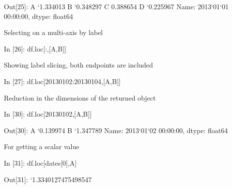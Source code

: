 \documentclass[letterpaper,10pt,english]{sphinxmanual}
\def\PYGZhy{\char`\-}
\def\PYGZsq{\char`\'}
\renewcommand\PYGZsq{\textquotesingle}
\begin{document}
\begin{OriginalVerbatim}[commandchars=\\\{\}]
\textcolor{nbsphinxout}{Out[25]: }A   \PYGZhy{}1.334013
         B   \PYGZhy{}0.348297
         C    0.388654
         D   \PYGZhy{}0.225967
         Name: 2013\PYGZhy{}01\PYGZhy{}01 00:00:00, dtype: float64
\end{OriginalVerbatim}

Selecting on a multi-axis by label

\begin{OriginalVerbatim}[commandchars=\\\{\}]
\textcolor{nbsphinxin}{In [26]: }df.loc[:,[\PYGZsq{}A\PYGZsq{},\PYGZsq{}B\PYGZsq{}]]
\end{OriginalVerbatim}

Showing label slicing, both endpoints are included

\begin{OriginalVerbatim}[commandchars=\\\{\}]
\textcolor{nbsphinxin}{In [27]: }df.loc[\PYGZsq{}20130102\PYGZsq{}:\PYGZsq{}20130104\PYGZsq{},[\PYGZsq{}A\PYGZsq{},\PYGZsq{}B\PYGZsq{}]]
\end{OriginalVerbatim}

Reduction in the dimensions of the returned object

\begin{OriginalVerbatim}[commandchars=\\\{\}]
\textcolor{nbsphinxin}{In [30]: }df.loc[\PYGZsq{}20130102\PYGZsq{},[\PYGZsq{}A\PYGZsq{},\PYGZsq{}B\PYGZsq{}]]
\end{OriginalVerbatim}

\begin{OriginalVerbatim}[commandchars=\\\{\}]
\textcolor{nbsphinxout}{Out[30]: }A   \PYGZhy{}0.139974
         B   \PYGZhy{}1.347789
         Name: 2013\PYGZhy{}01\PYGZhy{}02 00:00:00, dtype: float64
\end{OriginalVerbatim}

For getting a scalar value

\begin{OriginalVerbatim}[commandchars=\\\{\}]
\textcolor{nbsphinxin}{In [31]: }df.loc[dates[0],\PYGZsq{}A\PYGZsq{}]
\end{OriginalVerbatim}

\begin{OriginalVerbatim}[commandchars=\\\{\}]
\textcolor{nbsphinxout}{Out[31]: }\PYGZhy{}1.3340127475498547
\end{OriginalVerbatim}
\end{document}

